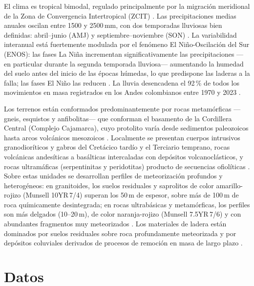 \documentclass[12pt, a4paper]{article}
\begin{document}
El clima es tropical bimodal, regulado principalmente por la migración meridional de
la Zona de Convergencia Intertropical (ZCIT) \citep{bedoya2019, aristizabal2026, poveda2011}. Las
precipitaciones medias anuales oscilan entre 1500 y 2500\,mm, con dos temporadas
lluviosas bien definidas: abril–junio (AMJ) y septiembre–noviembre (SON)
\citep{bedoya2019, aristizabal2026}. La variabilidad interanual está fuertemente
modulada por el fenómeno El Niño-Oscilación del Sur (ENOS): las fases La Niña
incrementan significativamente las precipitaciones —en particular durante la segunda
temporada lluviosa— aumentando la humedad del suelo antes del inicio de las épocas
húmedas, lo que predispone las laderas a la falla; las fases El Niño las reducen
\citep{aristizabal2026, poveda2011}. La lluvia desencadena el 92\,\% de todos los
movimientos en masa registrados en los Andes colombianos entre 1970 y 2023
\citep{aristizabal2020}.

Los terrenos están conformados predominantemente por rocas metamórficas —gneis,
esquistos y anfibolitas— que conforman el basamento de la Cordillera Central
(Complejo Cajamarca), cuyo protolito varía desde sedimentos paleozoicos hasta arcos
volcánicos mesozoicos \citep{cediel2003}. Localmente se presentan
cuerpos intrusivos granodioríticos y gabros del Cretácico tardío y el Terciario
temprano, rocas volcánicas andesíticas a basálticas intercaladas con depósitos
volcanoclásticos, y rocas ultramáficas (serpentinitas y peridotitas) producto de
secuencias ofiolíticas \citep{cediel2003}. Sobre estas unidades se
desarrollan perfiles de meteorización profundos y heterogéneos: en granitoides,
los suelos residuales y saprolitos de color amarillo-rojizo (Munsell 10YR\,7/4)
superan los 50\,m de espesor, sobre más de 100\,m de roca químicamente desintegrada;
en rocas ultrabásicas y metamórficas, los perfiles son más delgados (10–20\,m), de
color naranja-rojizo (Munsell 7.5YR\,7/6) y con abundantes fragmentos muy
meteorizados \citep{aristizabal2005, aristizabal2025}. Los materiales de ladera están
dominados por suelos residuales sobre roca profundamente meteorizada y por depósitos
coluviales derivados de procesos de remoción en masa de largo plazo \citep{aristizabal2005}.

\section{Datos}
\label{sec:data}
\end{document}
